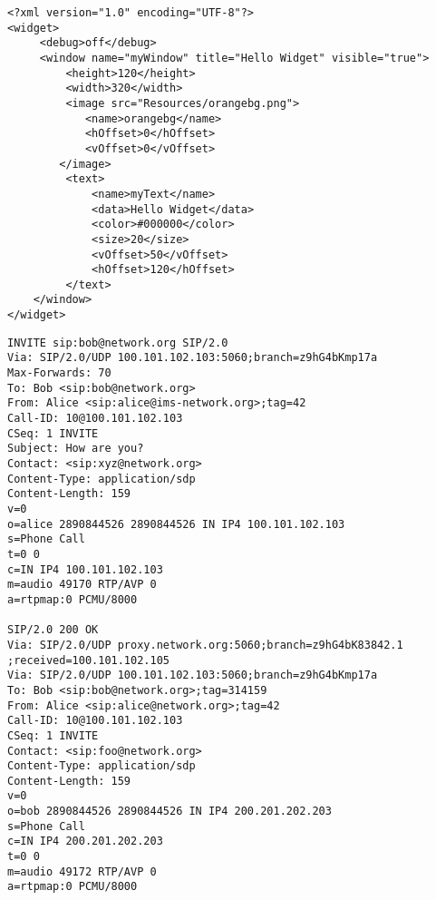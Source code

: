 
\begin{appendix}

\begin{lstlisting}
<?xml version="1.0" encoding="UTF-8"?>
<widget>
	 <debug>off</debug>
	 <window name="myWindow" title="Hello Widget" visible="true">
		 <height>120</height>
		 <width>320</width>
		 <image src="Resources/orangebg.png">
			<name>orangebg</name>
			<hOffset>0</hOffset>
			<vOffset>0</vOffset>
		</image>
		 <text>
			 <name>myText</name>
			 <data>Hello Widget</data>
			 <color>#000000</color>
			 <size>20</size>
			 <vOffset>50</vOffset>
			 <hOffset>120</hOffset>
		 </text>
	</window>
</widget>
\end{lstlisting}

\newpage


\begin{lstlisting}
INVITE sip:bob@network.org SIP/2.0
Via: SIP/2.0/UDP 100.101.102.103:5060;branch=z9hG4bKmp17a
Max-Forwards: 70
To: Bob <sip:bob@network.org>
From: Alice <sip:alice@ims-network.org>;tag=42
Call-ID: 10@100.101.102.103
CSeq: 1 INVITE
Subject: How are you?
Contact: <sip:xyz@network.org>
Content-Type: application/sdp
Content-Length: 159
v=0
o=alice 2890844526 2890844526 IN IP4 100.101.102.103
s=Phone Call
t=0 0
c=IN IP4 100.101.102.103
m=audio 49170 RTP/AVP 0
a=rtpmap:0 PCMU/8000

SIP/2.0 200 OK
Via: SIP/2.0/UDP proxy.network.org:5060;branch=z9hG4bK83842.1
;received=100.101.102.105
Via: SIP/2.0/UDP 100.101.102.103:5060;branch=z9hG4bKmp17a
To: Bob <sip:bob@network.org>;tag=314159
From: Alice <sip:alice@network.org>;tag=42
Call-ID: 10@100.101.102.103
CSeq: 1 INVITE
Contact: <sip:foo@network.org>
Content-Type: application/sdp
Content-Length: 159
v=0
o=bob 2890844526 2890844526 IN IP4 200.201.202.203
s=Phone Call
c=IN IP4 200.201.202.203
t=0 0
m=audio 49172 RTP/AVP 0
a=rtpmap:0 PCMU/8000
\end{lstlisting}


\end{appendix}



\endinput
